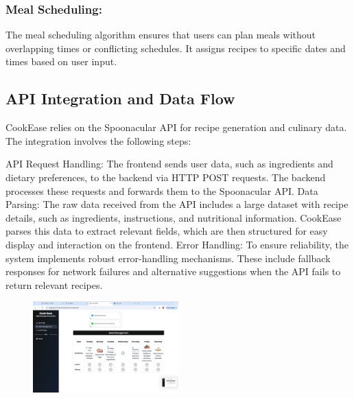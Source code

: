 \documentclass[10pt,twocolumn]{article}
\begin{document}
\subsubsection{Meal Scheduling:}
The meal scheduling algorithm ensures that users can plan meals without overlapping times or conflicting schedules. It assigns recipes to specific dates and times based on user input.


\subsection{API Integration and Data Flow}
CookEase relies on the Spoonacular API for recipe generation and culinary data. The integration involves the following steps:

API Request Handling: The frontend sends user data, such as ingredients and dietary preferences, to the backend via HTTP POST requests. The backend processes these requests and forwards them to the Spoonacular API.
Data Parsing: The raw data received from the API includes a large dataset with recipe details, such as ingredients, instructions, and nutritional information. CookEase parses this data to extract relevant fields, which are then structured for easy display and interaction on the frontend.
Error Handling: To ensure reliability, the system implements robust error-handling mechanisms. These include fallback responses for network failures and alternative suggestions when the API fails to return relevant recipes.
\begin{figure}[h!]
\includegraphics[width=0.5\textwidth]{images/RemovingMeal.png}
\centering
\end{figure} 
\end{document}
